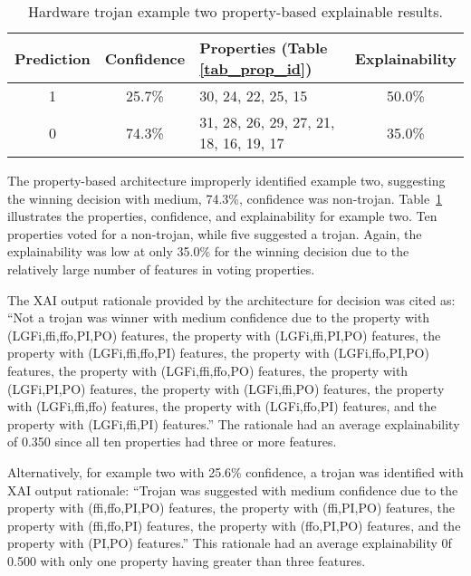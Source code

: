 \begin{table}[H]
    \renewcommand{\arraystretch}{1.3}
    \caption{Hardware trojan example two property-based explainable results.}
    \begin{center}
    \begin{tabular}{|c|c|p{}|c|}
        \hline
         Prediction &  Confidence &  Properties (Table \ref{tab_prop_id}) &  Explainability \\
        \hline
        \hline
        1 & 25.7\% & 30, 24, 22, 25, 15 & 50.0\% \\
        \hline
        0 & 74.3\% & 31, 28, 26, 29, 27, 21, 18, 16, 19, 17 & 35.0\% \\
        \hline
    \end{tabular}
    \end{center}
    \label{tab_prop_exp_ex_2}
\end{table}

The property-based architecture improperly identified example two, suggesting
the winning decision with medium, 74.3\%, confidence was non-trojan.
Table~\ref{tab_prop_exp_ex_2} illustrates the properties, confidence, and
explainability for example two.  Ten properties voted for a non-trojan, while
five suggested a trojan.  Again, the explainability was low at only 35.0\% for
the winning decision due to the relatively large number of features in voting
properties.

The XAI output rationale provided by the
architecture for decision was cited as: ``Not a trojan was winner with medium
confidence due to the property with (LGFi,ffi,ffo,PI,PO) features, the property
with (LGFi,ffi,PI,PO) features, the property with (LGFi,ffi,ffo,PI) features,
the property with (LGFi,ffo,PI,PO) features, the property with (LGFi,ffi,ffo,PO)
features, the property with (LGFi,PI,PO) features, the property with
(LGFi,ffi,PO) features, the property with (LGFi,ffi,ffo) features, the property
with (LGFi,ffo,PI) features, and the property with (LGFi,ffi,PI) features.'' The
rationale had an average explainability of 0.350 since all ten properties had
three or more features.

Alternatively, for example two with 25.6\% confidence, a trojan was identified
with XAI output rationale: ``Trojan was suggested with medium confidence due to
the property with (ffi,ffo,PI,PO) features, the property with (ffi,PI,PO)
features, the property with (ffi,ffo,PI) features, the property with (ffo,PI,PO)
features, and the property with (PI,PO) features.''  This rationale had an average
explainability 0f 0.500 with only one property having greater than three features.

